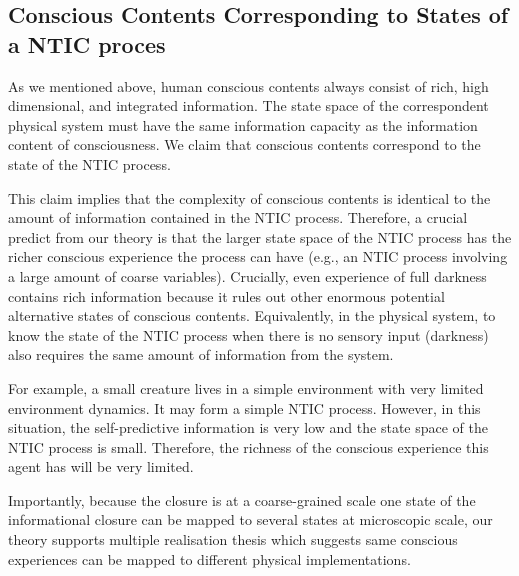 \documentclass[utf8]{article}
\begin{document}
		\subsection{Conscious Contents Corresponding to States of a NTIC proces}
        As we mentioned above, human conscious contents always consist of rich,  high dimensional, and integrated information. The state space of the correspondent physical system must have the same information capacity as the information content of consciousness.  We claim that conscious contents correspond to the state of the NTIC process. 
        
        This claim implies that the complexity of conscious contents is identical to the amount of information contained in the NTIC process. Therefore, a crucial predict from our theory is that the larger state space of the NTIC process has the richer conscious experience the process can have (e.g., an NTIC process involving a large amount of coarse variables). Crucially, even experience of full darkness contains rich information because it rules out other enormous potential alternative states of conscious contents. Equivalently, in the physical system, to know the state of the NTIC process when there is no sensory input (darkness) also requires the same amount of information from the system. 
        
        For example, a small creature lives in a simple environment with very limited environment dynamics. It may form a simple NTIC process. However, in this situation, the self-predictive information is very low and the state space of the NTIC process is small. Therefore, the richness of the conscious experience this agent has will be very limited. 
        
        Importantly, because the closure is at a coarse-grained scale one state of the informational closure can be mapped to several states at microscopic scale, our theory supports multiple realisation thesis  which suggests same conscious experiences can be mapped to different physical implementations. 
        
        
\end{document}
